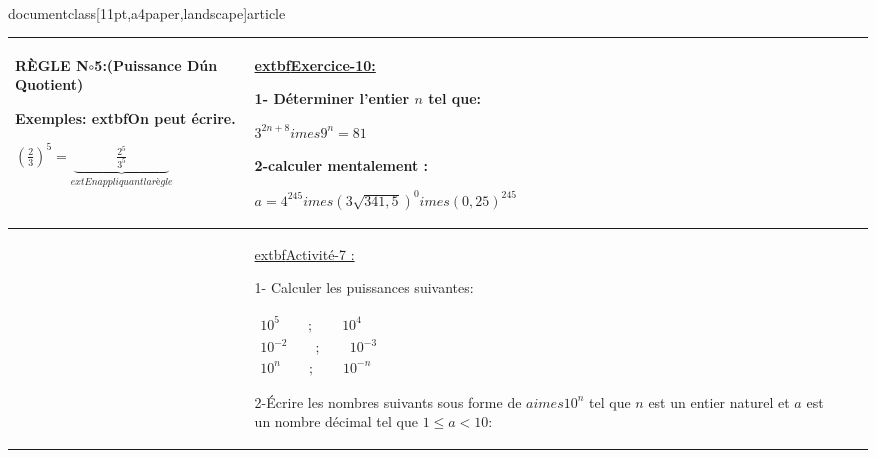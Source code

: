 \\documentclass[11pt,a4paper,landscape]{article}
\begin{document}
\begin{longtable}{|>{\centering\arraybackslash}p{3cm}|>{\raggedright\arraybackslash}p{5cm}|>{\raggedright\arraybackslash}p{13.5cm}|>{\raggedright\arraybackslash}p{5cm}|}
\begin{BoxRafa}[colbacktitle = green]{RÈGLE N$\circ$5:(Puissance D\'un Quotient)}
\begin{tikzpicture}[
roundnode/.style={circle, draw=green!60, fill=green!5, very thick, minimum size=7mm},
squarednode/.style={rectangle, draw=red!60, fill=red!5, very thick, minimum size=5mm},
]
\end{tikzpicture}\vspace{-.1cm}
\end{BoxRafa}
\begin{BoxRafa}[colbacktitle = Orange]{Exemples:}
extbf{On peut écrire.}

$\left(\frac23\right)^5=\underbrace{\quad\qquad\frac{2^5}{3^5}\quad\qquad}_{ext{En appliquant la règle}}$

\end{BoxRafa}
&
\colorbox{yellow!50!white}{\uline{\sffamily extbf{Exercice-10:}}}\par
1- Déterminer l’entier $n$ tel que:

$3^{2n+8}imes9^n=81$

2-calculer mentalement :

$a{=}4^{245}{imes}(3\sqrt{341,5})^0{imes}(0,25)^{245}$
\\
\hline
&
\colorbox{yellow!50!white}{\uline{\sffamily extbf{Activité-7 :} }}\par%

1- Calculer les puissances suivantes:

$\begin{array}{c}10^5\qquad;\qquad10^4\\10^{-2}\qquad;\qquad10^{-3}\\10^n\qquad;\qquad10^{-n}\end{array}$

2-Écrire les nombres suivants sous forme de $aimes10^n$ tel que $n$ est un entier naturel et $a$ est un nombre décimal tel que $1\leq a<10$: 


\end{longtable}
\end{document}
